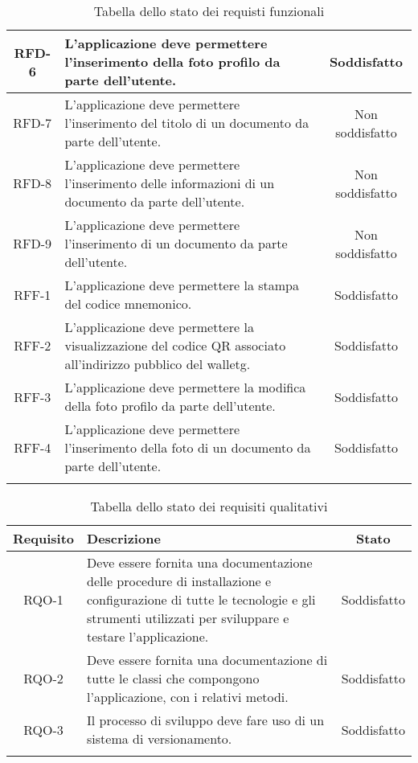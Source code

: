 \begin{longtable}{|c|p{7.65cm}|c|}
	\hline
	RFD-6     & L'applicazione deve permettere l'inserimento della foto profilo da parte dell'utente. & Soddisfatto \\
	\hline
	RFD-7     & L'applicazione deve permettere l'inserimento del titolo di un documento da parte dell'utente. & Non soddisfatto \\
	\hline
	RFD-8     & L'applicazione deve permettere l'inserimento delle informazioni di un documento da parte dell'utente. & Non soddisfatto \\
	\hline
	RFD-9     & L'applicazione deve permettere l'inserimento di un documento da parte dell'utente. & Non soddisfatto \\
	\hline
	RFF-1     & L'applicazione deve permettere la stampa del codice mnemonico. & Soddisfatto \\
	\hline
	RFF-2     & L'applicazione deve permettere la visualizzazione del codice QR associato all'indirizzo pubblico del \gls{walletg}. & Soddisfatto \\
	\hline
	RFF-3     & L'applicazione deve permettere la modifica della foto profilo da parte dell'utente. & Soddisfatto \\
	\hline
	RFF-4     & L'applicazione deve permettere l'inserimento della foto di un documento da parte dell'utente. & Soddisfatto \\
	\hline
	
	\caption{Tabella dello stato dei requisti funzionali}
	\label{tab:stato-requisiti-funzionali}
\end{longtable}

\begin{longtable}{|c|p{8.35cm}|c|}
	\hline
	\rowcolor{gray}
	\textbf{Requisito} & \textbf{Descrizione} & \textbf{Stato} \\
	\hline
	RQO-1    & Deve essere fornita una documentazione delle procedure di installazione e configurazione di tutte le tecnologie e gli strumenti utilizzati per sviluppare e testare l'applicazione. & Soddisfatto \\
	\hline
	RQO-2    & Deve essere fornita una documentazione di tutte le classi che compongono l'applicazione, con i relativi metodi. & Soddisfatto \\
	\hline
	RQO-3    & Il processo di sviluppo deve fare uso di un sistema di versionamento. & Soddisfatto \\
	\hline
	
	\caption{Tabella dello stato dei requisiti qualitativi}
	\label{tab:stato-requisiti-qualitativi}
\end{longtable}

